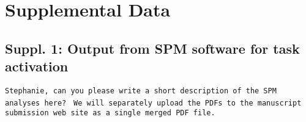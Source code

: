 \section*{Supplemental Data}
\subsection{Suppl. 1: Output from SPM software for task activation}
\verb|Stephanie, can you please write a short description of the SPM analyses here? |
\verb|We will separately upload the PDFs to the manuscript submission web site as a single merged PDF file.|
